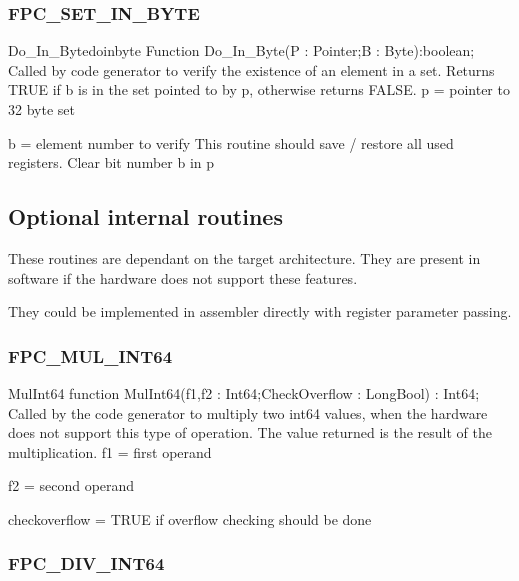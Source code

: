 \documentclass [a4paper,12pt]{article}
\begin{document}
\subsubsection{FPC{\_}SET{\_}IN{\_}BYTE}
\label{subsubsec:mylabel97}

\begin{functionl}{Do{\_}In{\_}Byte}{doinbyte}
\Declaration
Function Do{\_}In{\_}Byte(P : Pointer;B : Byte):boolean;
\Description
Called by code generator to verify the existence of an element in a set.
Returns TRUE if b is in the set pointed to by p, otherwise returns FALSE.
\Parameters
p = pointer to 32 byte set \par b = element number to verify
\Notes
This routine should save / restore all used registers.
\Algorithm
Clear bit number b in p
\end{functionl}

\subsection{Optional internal routines}
\label{subsec:optional}

These routines are dependant on the target architecture. They are present in
software if the hardware does not support these features.

They could be implemented in assembler directly with register parameter
passing.

\subsubsection{FPC{\_}MUL{\_}INT64}
\label{subsubsec:mylabel98}

\begin{function}{MulInt64}
\Declaration
function MulInt64(f1,f2 : Int64;CheckOverflow : LongBool) : Int64;
\Description
Called by the code generator to multiply two int64 values, when the hardware
does not support this type of operation. The value returned is the result of
the multiplication.
\Parameters
f1 = first operand \par
f2 = second operand \par
checkoverflow = TRUE if overflow checking should be done
\end{function}

\subsubsection{FPC{\_}DIV{\_}INT64}
\label{subsubsec:mylabel99}
\end{document}

